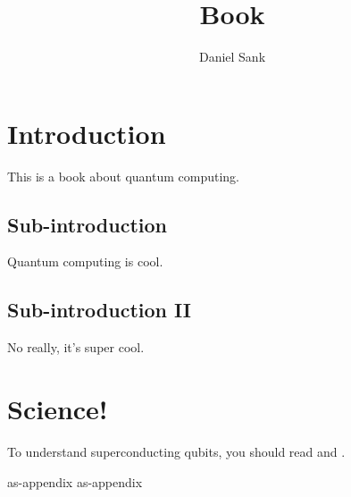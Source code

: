 \documentclass{book}
\author{Daniel Sank}
\title{Book}
\begin{document}
\maketitle

\tableofcontents


\chapter{Introduction}

This is a book about quantum computing.

\section{Sub-introduction}

Quantum computing is cool.

\section{Sub-introduction II}

No really, it's super cool.


\chapter{Science!}

To understand superconducting qubits, you should read \mycitetype {} and \mycitetype {}.


\begin{appendix}
{as-appendix}
{as-appendix}
\end{appendix}
\end{document}

